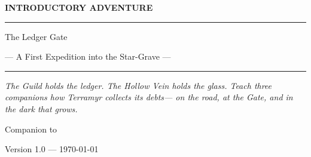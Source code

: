 \begin{titlepage}
  \thispagestyle{empty}
  \centering
  \vspace*{1.8cm}

  {\GameSans\footnotesize\bfseries\color{ash} INTRODUCTORY ADVENTURE\par}
  \vspace{0.6cm}
  {\color{blood}\rule{0.55\textwidth}{0.6pt}\par}
  \vspace{0.8cm}

  \shardmark[2.4cm]

  \vspace{0.9cm}

  {\TitleFont\Huge\color{shardink} The Ledger Gate \par}

  \vspace{0.45cm}
  {\TitleFont\large\color{blood} --- A First Expedition into the Star-Grave ---\par}

  \vspace{0.55cm}
  {\color{blood}\rule{0.55\textwidth}{0.6pt}\par}

  \vspace{1.4cm}

  \begin{minipage}{0.72\textwidth}
    \centering
    \itshape\color{shardink}
    The Guild holds the ledger. The Hollow Vein holds the glass.
    Teach three companions how Terramyr collects its debts---
    on the road, at the Gate, and in the dark that grows.
  \end{minipage}

  \vfill

  {\GameSans\small\color{ash} Companion to \game{} \par}
  \vspace{0.35cm}
  {\GameSans\small\color{ash} Version 1.0 --- \today \par}
\end{titlepage}
